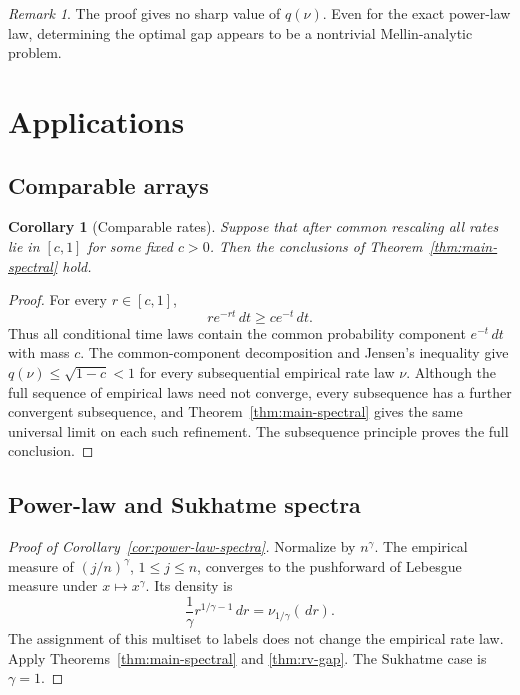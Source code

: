 \documentclass[11pt]{article}
\newtheorem{corollary}[theorem]{Corollary}
\theoremstyle{definition}
\theoremstyle{remark}
\newtheorem{remark}[theorem]{Remark}
\newcommand{\dd}{\,d}
\begin{document}
\begin{remark}
The proof gives no sharp value of $q(\nu)$.  Even for the exact power-law law,
determining the optimal gap appears to be a nontrivial Mellin-analytic problem.
\end{remark}

\section{Applications}
\label{sec:applications}

\subsection{Comparable arrays}

\begin{corollary}[Comparable rates]
\label{cor:comparable}
Suppose that after common rescaling all rates lie in $[c,1]$ for some fixed
$c>0$.  Then the conclusions of Theorem~\ref{thm:main-spectral} hold.
\end{corollary}

\begin{proof}
For every $r\in[c,1]$,
\[
 r e^{-rt}\dd t\ge c e^{-t}\dd t.
\]
Thus all conditional time laws contain the common probability component
$e^{-t}\dd t$ with mass $c$.  The common-component decomposition and
Jensen's inequality give $q(\nu)\le\sqrt{1-c}<1$ for every subsequential
empirical rate law $\nu$.  Although the full sequence of empirical laws need
not converge, every subsequence has a further convergent subsequence, and
Theorem~\ref{thm:main-spectral} gives the same universal limit on each such
refinement.  The subsequence principle proves the full conclusion.
\end{proof}

\subsection{Power-law and Sukhatme spectra}

\begin{proof}[Proof of Corollary~\ref{cor:power-law-spectra}]
Normalize by $n^\gamma$.  The empirical measure of
$(j/n)^\gamma$, $1\le j\le n$, converges to the pushforward of Lebesgue measure
under $x\mapsto x^\gamma$.  Its density is
\[
 \frac1\gamma r^{1/\gamma-1}\dd r=\nu_{1/\gamma}(\dd r).
\]
The assignment of this multiset to labels does not change the empirical rate
law.  Apply Theorems~\ref{thm:main-spectral} and
\ref{thm:rv-gap}.  The Sukhatme case is $\gamma=1$.
\end{proof}
\end{document}
